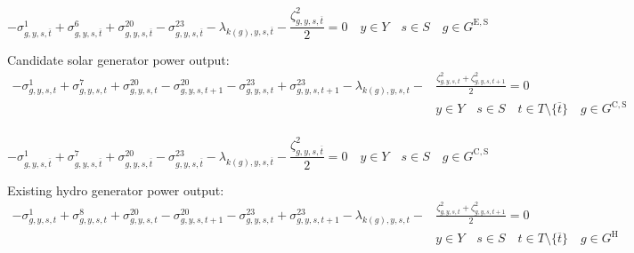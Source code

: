 \documentclass{article}
\newcommand{\sGeneratorsExistingSolar}{G^{\mathrm{E,S}}}
\newcommand{\sGeneratorsCandidateSolar}{G^{\mathrm{C,S}}}
\newcommand{\sGeneratorsHydro}{G^{\mathrm{H}}}
\newcommand{\sYears}{Y}
\newcommand{\sScenarios}{S}
\newcommand{\sIntervals}{T}
\newcommand{\iGenerator}{g}
\newcommand{\iYear}{y}
\newcommand{\iScenario}{s}
\newcommand{\iInterval}{t}
\newcommand{\iIntervalTerminal}{\overline{\iInterval}}
\newcommand{\iZone}{z}
\newcommand{\dMinPowerOutput}[1][\iGenerator,\iYear,\iScenario,\iInterval]{\sigma_{#1}^{1}}
\newcommand{\dMaxPowerOutputSolarExisting}[1][\iGenerator,\iYear,\iScenario,\iInterval]{\sigma_{#1}^{6}}
\newcommand{\dMaxPowerOutputSolarCandidate}[1][\iGenerator,\iYear,\iScenario,\iInterval]{\sigma_{#1}^{7}}
\newcommand{\dMaxPowerOutputHydro}[1][\iGenerator,\iYear,\iScenario,\iInterval]{\sigma_{#1}^{8}}
\newcommand{\dRampRateUp}[1][\iGenerator,\iYear,\iScenario,\iInterval]{\sigma_{#1}^{20}}
\newcommand{\dRampRateDown}[1][\iGenerator,\iYear,\iScenario,\iInterval]{\sigma_{#1}^{23}}
\newcommand{\dPowerBalance}[1][\iZone,\iYear,\iScenario,\iInterval]{\lambda_{#1}}
\newcommand{\dGeneratorEnergyOutput}[1][\iGenerator,\iYear,\iScenario,\iInterval]{\zeta_{#1}^{2}}
\begin{document}
\begin{equation}
-\dMinPowerOutput[\iGenerator,\iYear,\iScenario,\iIntervalTerminal] + \dMaxPowerOutputSolarExisting[\iGenerator,\iYear,\iScenario,\iIntervalTerminal] + \dRampRateUp[\iGenerator,\iYear,\iScenario,\iIntervalTerminal] - \dRampRateDown[\iGenerator,\iYear,\iScenario,\iIntervalTerminal] - \dPowerBalance[k(\iGenerator),\iYear,\iScenario,\iIntervalTerminal] - \frac{\dGeneratorEnergyOutput[\iGenerator,\iYear,\iScenario,\iIntervalTerminal]}{2} = 0 \quad \iYear \in \sYears \quad \iScenario \in \sScenarios \quad \iGenerator \in \sGeneratorsExistingSolar
\end{equation}

Candidate solar generator power output:
\begin{align}
-\dMinPowerOutput + \dMaxPowerOutputSolarCandidate + \dRampRateUp - \dRampRateUp[\iGenerator,\iYear,\iScenario,\iInterval+1] - \dRampRateDown + \dRampRateDown[\iGenerator,\iYear,\iScenario,\iInterval+1] - \dPowerBalance[k(\iGenerator),\iYear,\iScenario,\iInterval] - & \frac{\dGeneratorEnergyOutput + \dGeneratorEnergyOutput[\iGenerator,\iYear,\iScenario,\iInterval+1]}{2} = 0 \\\nonumber
& \iYear \in \sYears \quad \iScenario \in \sScenarios \quad \iInterval \in \sIntervals \setminus \{\iIntervalTerminal\} \quad \iGenerator \in \sGeneratorsCandidateSolar\\\nonumber
\end{align}

\begin{equation}
-\dMinPowerOutput[\iGenerator,\iYear,\iScenario,\iIntervalTerminal] + \dMaxPowerOutputSolarCandidate[\iGenerator,\iYear,\iScenario,\iIntervalTerminal] + \dRampRateUp[\iGenerator,\iYear,\iScenario,\iIntervalTerminal] - \dRampRateDown[\iGenerator,\iYear,\iScenario,\iIntervalTerminal] - \dPowerBalance[k(\iGenerator),\iYear,\iScenario,\iIntervalTerminal] - \frac{\dGeneratorEnergyOutput[\iGenerator,\iYear,\iScenario,\iIntervalTerminal]}{2} = 0 \quad \iYear \in \sYears \quad \iScenario \in \sScenarios \quad \iGenerator \in \sGeneratorsCandidateSolar
\end{equation}

Existing hydro generator power output:
\begin{align}
-\dMinPowerOutput + \dMaxPowerOutputHydro + \dRampRateUp - \dRampRateUp[\iGenerator,\iYear,\iScenario,\iInterval+1] - \dRampRateDown + \dRampRateDown[\iGenerator,\iYear,\iScenario,\iInterval+1] - \dPowerBalance[k(\iGenerator),\iYear,\iScenario,\iInterval] - & \frac{\dGeneratorEnergyOutput + \dGeneratorEnergyOutput[\iGenerator,\iYear,\iScenario,\iInterval+1]}{2} = 0 \\\nonumber
& \iYear \in \sYears \quad \iScenario \in \sScenarios \quad \iInterval \in \sIntervals \setminus \{\iIntervalTerminal\} \quad \iGenerator \in \sGeneratorsHydro\\\nonumber
\end{align}
\end{document}
